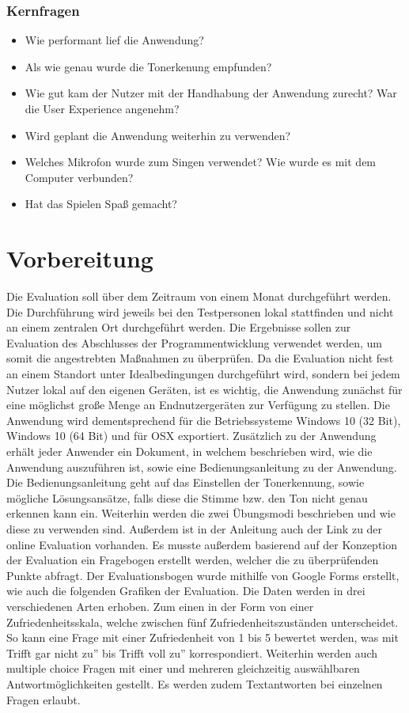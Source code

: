 \subsubsection*{Kernfragen}
\begin{itemize}
    \item Wie performant lief die Anwendung?
    \item Als wie genau wurde die Tonerkenung empfunden?
    \item Wie gut kam der Nutzer mit der Handhabung der Anwendung zurecht? War die User Experience angenehm?
    \item Wird geplant die Anwendung weiterhin zu verwenden?
    \item Welches Mikrofon wurde zum Singen verwendet? Wie wurde es mit dem Computer verbunden?
    \item Hat das Spielen Spaß gemacht?
\end{itemize}

\section{Vorbereitung}
Die Evaluation soll über dem Zeitraum von einem Monat durchgeführt werden. Die Durchführung wird jeweils bei den Testpersonen lokal stattfinden und nicht an einem zentralen Ort durchgeführt werden. Die Ergebnisse sollen zur Evaluation des Abschlusses der Programmentwicklung verwendet werden, um somit die angestrebten Maßnahmen zu überprüfen. 
Da die Evaluation nicht fest an einem Standort unter Idealbedingungen durchgeführt wird, sondern bei jedem Nutzer lokal auf den eigenen Geräten, ist es wichtig, die Anwendung zunächst für eine möglichst große Menge an Endnutzergeräten zur Verfügung zu stellen. Die Anwendung wird dementsprechend für die Betriebssysteme Windows 10 (32 Bit), Windows 10 (64 Bit) und für OSX exportiert. Zusätzlich zu der Anwendung erhält jeder Anwender ein Dokument, in welchem beschrieben wird, wie die Anwendung auszuführen ist, sowie eine Bedienungsanleitung zu der Anwendung. Die Bedienungsanleitung geht auf das Einstellen der Tonerkennung, sowie mögliche Lösungsansätze, falls diese die Stimme bzw. den Ton nicht genau erkennen kann ein. Weiterhin werden die zwei Übungsmodi beschrieben und wie diese zu verwenden sind. Außerdem ist in der Anleitung auch der Link zu der online Evaluation vorhanden. Es musste außerdem basierend auf der Konzeption der Evaluation ein Fragebogen erstellt werden, welcher die zu überprüfenden Punkte abfragt. Der Evaluationsbogen wurde mithilfe von Google Forms erstellt, wie auch die folgenden Grafiken der Evaluation. Die Daten werden in drei verschiedenen Arten erhoben. Zum einen in der Form von einer Zufriedenheitsskala, welche zwischen fünf Zufriedenheitszuständen unterscheidet. So kann eine Frage mit einer Zufriedenheit von 1 bis 5 bewertet werden, was mit \glqq Trifft gar nicht zu'' bis \glqq Trifft voll zu'' korrespondiert. Weiterhin werden auch multiple choice Fragen mit einer und mehreren gleichzeitig auswählbaren Antwortmöglichkeiten gestellt. Es werden zudem Textantworten bei einzelnen Fragen erlaubt. 

